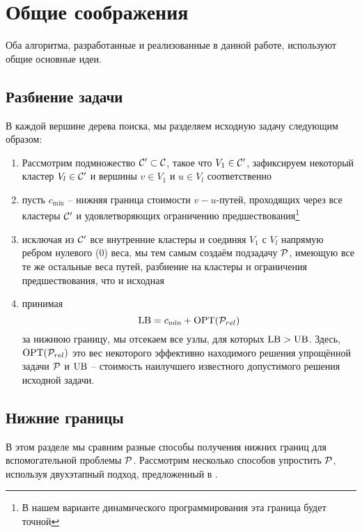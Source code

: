 \section{Общие соображения}\label{sec:pre}
Оба алгоритма,
разработанные и реализованные в данной работе,
используют общие основные идеи.

\subsection{Разбиение задачи}
В каждой вершине дерева поиска,
мы разделяем исходную задачу следующим образом:
\begin{enumerate}
	\item
	Рассмотрим подмножество
	$\CX'\subset\CX$, 
	такое что $V_1\in\CX'$, 
	зафиксируем некоторый кластер $V_l\in\CX'$ 
	и вершины $v\in V_1$ и $u\in V_l$ 
	соответственно
	\item
	пусть $c_{\min}$ -- нижняя граница стоимости $v-u$-путей,
	проходящих через все кластеры $\CX'$ 
	и удовлетворяющих ограничению предшествования\footnote{В нашем варианте динамического программирования эта граница будет точной} 
	\item
	исключая из $\CX'$ все внутренние кластеры и соединяя 
	$V_1$ с $V_l$ напрямую ребром нулевого (0) веса, 
	мы тем самым создаём подзадачу $\P$, 
	имеющую все те же остальные веса путей, разбиение на кластеры и ограничения предшествования,
	что и исходная
	\item
	принимая
	\begin{equation}\label{e:bounds}
		\LB = c_{\min} + \OPT{\P_{rel}}
	\end{equation}
	за нижнюю границу,
	мы отсекаем все узлы,
	для которых
	$\LB > \UB$. 
	Здесь, $\OPT{\P_{rel}}$ 
	это вес некоторого эффективно находимого решения упрощённой задачи $\P$
	и $\UB$ -- стоимость наилучшего известного допустимого решения исходной задачи.
\end{enumerate}

\subsection{Нижние границы}\label{ssec:LBs}
В этом разделе мы сравним разные способы получения нижних границ
для вспомогательной проблемы
$\P$.
Рассмотрим несколько способов упростить
$\P$, 
используя двухэтапный подход,
предложенный в
\cite{SALMAN2020163}. 

